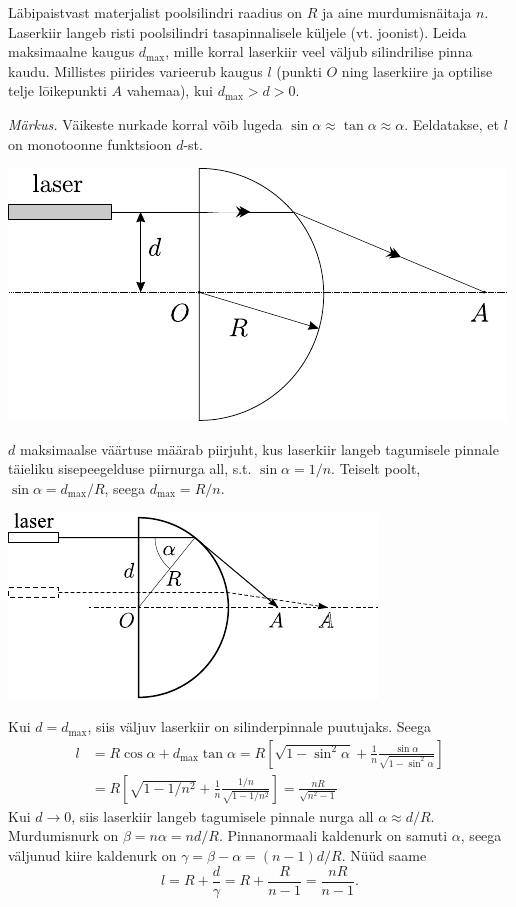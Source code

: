 
Läbipaistvast materjalist poolsilindri raadius on $R$ ja aine murdumisnäitaja $n$. Laserkiir langeb risti poolsilindri tasapinnalisele küljele (vt. joonist). Leida maksimaalne kaugus $d_{\max}$, mille korral laserkiir veel väljub silindrilise pinna kaudu. Millistes piirides varieerub kaugus $l$ (punkti $O$ ning laserkiire ja optilise telje lōikepunkti $A$ vahemaa), kui $d_{\max }>d>0$.

\emph{Märkus.} Väikeste nurkade korral võib lugeda $\sin \alpha \approx \tan \alpha \approx \alpha$. Eeldatakse, et $l$ on monotoonne funktsioon $d$-st.
\begin{center}
	\includegraphics[width=0.8\linewidth]{2004-v3g-07-yl.pdf}
\end{center}

\hint

\solu
$d$ maksimaalse väärtuse määrab piirjuht, kus laserkiir langeb tagumisele pinnale täieliku sisepeegelduse piirnurga all, s.t. $\sin \alpha=1 / n$. Teiselt poolt, $\sin \alpha=d_{\max } / R$, seega $d_{\max }=R / n$.
\begin{center}
	\includegraphics[width=0.8\linewidth]{2004-v3g-07-lah.pdf}
\end{center}
Kui $d=d_{\max}$, siis väljuv laserkiir on silinderpinnale puutujaks. Seega
$$
\begin{aligned}
	l &=R \cos \alpha+d_{\max } \tan \alpha=R\left[\sqrt{1-\sin ^{2} \alpha}+\frac{1}{n} \frac{\sin \alpha}{\sqrt{1-\sin ^{2} \alpha}}\right] \\
	&=R\left[\sqrt{1-1 / n^{2}}+\frac{1}{n} \frac{1 / n}{\sqrt{1-1 / n^{2}}}\right]=\frac{n R}{\sqrt{n^{2}-1}}
\end{aligned}
$$
Kui $d \rightarrow 0$, siis laserkiir langeb tagumisele pinnale nurga all $\alpha \approx d / R$. Murdumisnurk on $\beta=n \alpha=n d / R.$ Pinnanormaali kaldenurk on samuti $\alpha$, seega väljunud kiire kaldenurk on $\gamma=\beta-\alpha=(n-1) d / R$. Nüüd saame
$$
l=R+\frac{d}{\gamma}=R+\frac{R}{n-1}=\frac{n R}{n-1} .
$$
\probend